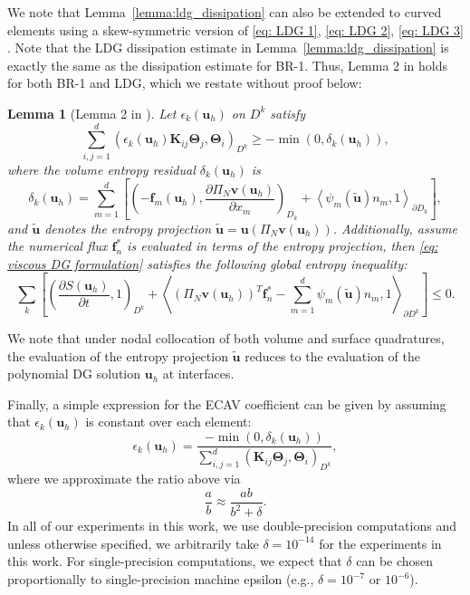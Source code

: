\documentclass{elsarticle}
\theoremstyle{definition}
\theoremstyle{plain}
\newtheorem{lemma}{Lemma}
\theoremstyle{plain}
\newcommand{\pd}[2]{\frac{\partial#1}{\partial#2}}
\newcommand{\LRp}[1]{\left( #1 \right)} %
\newcommand{\LRs}[1]{\left[ #1 \right]} %
\newcommand{\LRa}[1]{\left\langle #1 \right\rangle} %
\newcommand{\refone}[1]{{\color{red}#1}}
\newcommand{\reftwo}[1]{{\color{blue}#1}}
\renewcommand{\refone}[1]{#1}
\renewcommand{\reftwo}[1]{#1}
\begin{document}
\refone{We note that Lemma~\ref{lemma:ldg_dissipation} can also be extended to curved elements using a skew-symmetric version of \eqref{eq: LDG 1}, \eqref{eq: LDG 2}, \eqref{eq: LDG 3} \cite{chan2022entropy}.}
% 
Note that the LDG dissipation estimate in Lemma~\ref{lemma:ldg_dissipation} is exactly the same as the dissipation estimate for BR-1. Thus, Lemma 2 in \cite{chan2025artificial} holds for both BR-1 and LDG, which we restate without proof below:
\begin{lemma}[Lemma 2 in \cite{chan2025artificial}]
\label{lemma: entropy decay}
    Let $\epsilon_{k}(\bm{u}_h)$ on $D^k$ satisfy
    \begin{equation}
        \sum_{i,j = 1}^d\left(\epsilon_k(\bm{u}_h)\bm{K}_{ij}\bm{\Theta}_{j},\bm{\Theta}_i \right)_{D^k} \geq -\min{\left(0,\delta_k(\bm{u}_h)\right)},
    \end{equation}
    where the volume entropy residual $\delta_k(\bm{u}_h)$ is
    \begin{equation}\label{eqn: semi-discrete volume entropy residual}
        \delta_k(\bm{u}_h) = \sum_{m = 1}^d\left[\LRp{-\bm{f}_m(\bm{u}_h),\pd{\Pi_N\bm{v}\reftwo{(\bm{u}_h)}}{x_m}}_{D_k} + \LRa{\psi_m(\tilde{\bm{u}})n_m,1}_{\partial D_k} \right]\reftwo{,}
    \end{equation}
    \reftwo{and $\bm{\tilde{u}}$ denotes the entropy projection $\tilde{\bm{u}} = \bm{u}(\Pi_N \bm{v}(\bm{u}_h))$. Additionally, assume the numerical flux $\bm{f}^*_n$ is evaluated in terms of the entropy projection, then} \eqref{eq: viscous DG formulation} satisfies the following global entropy inequality:
    \begin{equation}
        \sum_k\LRs{\LRp{\pd{S(\bm{u}_h)}{t},1}_{D^k} + \LRa{\LRp{\Pi_N\bm{v}(\bm{u}_h)}^T\bm{f}^{*}_n - \sum_{m=1}^d\psi_{m}(\tilde{\bm{u}})n_m,1}_{\partial D^k}} \leq 0.
    \end{equation}
\end{lemma}
We note that under nodal collocation of both volume and surface quadratures, the evaluation of the entropy projection $\tilde{\bm{u}}$ reduces to the evaluation of the polynomial DG solution $\bm{u}_h$ at interfaces. 

Finally, a simple expression for the ECAV coefficient can be given by assuming that $\epsilon_{k}(\bm{u}_h)$ is constant over each element:
\begin{equation}
\epsilon_{k}(\bm{u}_h) = \frac{-\refone{\min{\left(0, \delta_k(\bm{u}_h)\right)}}}{\sum_{i,j=1}^d \LRp{\bm{K}_{ij}\bm{\Theta}_j, \bm{\Theta}_i}_{D^k}}, 
\label{eq:ECAV_coeff}
\end{equation}
where we approximate the ratio above via 
\begin{equation}
\frac{a}{b} \approx \frac{ab}{b^2 + \delta}.
\label{eq:regularized_ratio}
\end{equation}
\reftwo{In all of our experiments in this work, we use double-precision computations and} unless otherwise specified, we arbitrarily take $\delta = 10^{-14}$ for the experiments in this work. \reftwo{For single-precision computations, we expect that $\delta$ can be chosen proportionally to single-precision machine epsilon (e.g., $\delta = 10^{-7}$ or $10^{-6}$).} 
\end{document}
